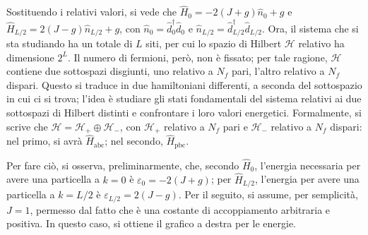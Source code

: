 \documentclass[11pt, a4paper]{scrartcl}
\theoremstyle{style}
\theoremstyle{style1}
\numberwithin{equation}{subsection}
\begin{document}
\noindent Sostituendo i relativi valori, si vede che $\hat{H}_0 = - 2 (J+g) \hat{n}_0 + g $ e $ \hat{H}_{L / 2}  = 2 ( J - g) \hat{n}_{L / 2}  + g$, con $\hat{n}_0 = \hat{d}^\dagger _0 \hat{d}_0$ e $\hat{n}_{L / 2}  = \hat{d}^\dagger _{L / 2}  \hat{d}_{L / 2} $.
Ora, il sistema che si sta studiando ha un totale di $L$ siti, per cui lo spazio di Hilbert $\mathcal{H} $ relativo ha dimensione $2^L$.
Il numero di fermioni, per\`o, non \`e fissato; per tale ragione, $\mathcal{H} $ contiene due sottospazi disgiunti, uno relativo a $N_f$ pari, l'altro relativo a $N_f$ dispari.
Questo si traduce in due hamiltoniani differenti, a seconda del sottospazio in cui ci si trova; l'idea \`e studiare gli stati fondamentali del sistema relativi ai due sottospazi di Hilbert distinti e confrontare i loro valori energetici.
Formalmente, si scrive che $\mathcal{H}  = \mathcal{H} _{+}  \oplus \mathcal{H} _-$, con $\mathcal{H} _+$ relativo a $N_f$ pari e $\mathcal{H} _-$ relativo a $N_f$ dispari: nel primo, si avr\`a $\hat{H}_\text{abc}$; nel secondo, $\hat{H}_\text{pbc}$.
\begin{center}
	\begin{minipage}
		{.45\columnwidth}
	Per fare ci\`o, si osserva, preliminarmente, che, secondo $\hat{H}_0$, l'energia necessaria per avere una particella a $k=0$ \`e $\varepsilon _0 = -2 (J+g)$; per $\hat{H}_{L / 2} $, l'energia per avere una particella a $k=L / 2$ \`e $\varepsilon _{L / 2} = 2 (J-g)$.
	Per il seguito, si assume, per semplicit\`a, $J=1$, permesso dal fatto che \`e una costante di accoppiamento arbitraria e positiva.
	In questo caso, si ottiene il grafico a destra per le energie.
	\end{minipage}
	\hfill
	\begin{minipage}
		{.45\columnwidth}
	\centering
	\end{minipage}
\end{center}
\end{document}
